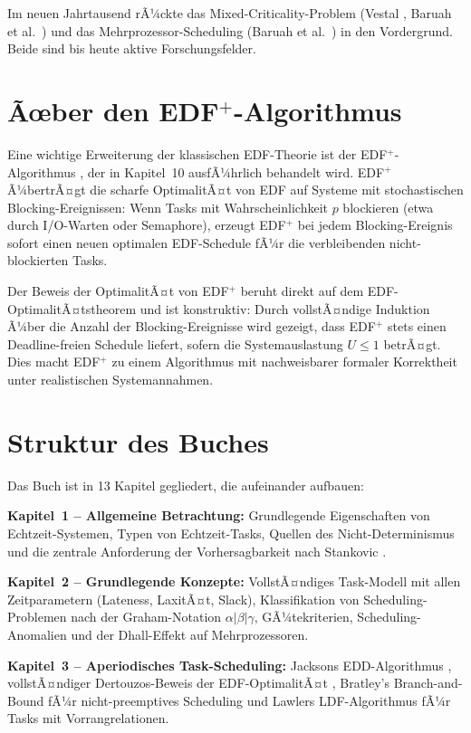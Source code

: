 ﻿\documentclass[a4paper,12pt]{report}
\theoremstyle{definition}
\begin{document}
Im neuen Jahrtausend rÃ¼ckte das Mixed-Criticality-Problem (Vestal \cite{Vestal2007},
Baruah et al.\ \cite{BaruahMCS2012}) und das Mehrprozessor-Scheduling (Baruah
et al.\ \cite{BaruahPfair1996}) in den Vordergrund. Beide sind bis heute
aktive Forschungsfelder.

\section*{Ãœber den EDF$^+$-Algorithmus}

Eine wichtige Erweiterung der klassischen EDF-Theorie ist der EDF$^+$-Algorithmus
\cite{Epp2026}, der in Kapitel~10 ausfÃ¼hrlich behandelt wird. EDF$^+$ Ã¼bertrÃ¤gt
die scharfe OptimalitÃ¤t von EDF auf Systeme mit stochastischen Blocking-Ereignissen:
Wenn Tasks mit Wahrscheinlichkeit $p$ blockieren (etwa durch I/O-Warten oder
Semaphore), erzeugt EDF$^+$ bei jedem Blocking-Ereignis sofort einen neuen
optimalen EDF-Schedule fÃ¼r die verbleibenden nicht-blockierten Tasks.

Der Beweis der OptimalitÃ¤t von EDF$^+$ beruht direkt auf dem EDF-OptimalitÃ¤tstheorem
und ist konstruktiv: Durch vollstÃ¤ndige Induktion Ã¼ber die Anzahl der
Blocking-Ereignisse wird gezeigt, dass EDF$^+$ stets einen Deadline-freien
Schedule liefert, sofern die Systemauslastung $U \leq 1$ betrÃ¤gt. Dies macht
EDF$^+$ zu einem Algorithmus mit nachweisbarer formaler Korrektheit unter
realistischen Systemannahmen.

\section*{Struktur des Buches}

Das Buch ist in 13 Kapitel gegliedert, die aufeinander aufbauen:

\textbf{Kapitel~1 -- Allgemeine Betrachtung:} Grundlegende Eigenschaften von
Echtzeit-Systemen, Typen von Echtzeit-Tasks, Quellen des Nicht-Determinismus
und die zentrale Anforderung der Vorhersagbarkeit nach Stankovic \cite{Stankovic1988}.

\textbf{Kapitel~2 -- Grundlegende Konzepte:} VollstÃ¤ndiges Task-Modell mit
allen Zeitparametern (Lateness, LaxitÃ¤t, Slack), Klassifikation von Scheduling-Problemen
nach der Graham-Notation $\alpha|\beta|\gamma$, GÃ¼tekriterien, Scheduling-Anomalien
und der Dhall-Effekt auf Mehrprozessoren.

\textbf{Kapitel~3 -- Aperiodisches Task-Scheduling:} Jacksons EDD-Algorithmus
\cite{Jackson1955}, vollstÃ¤ndiger Dertouzos-Beweis der EDF-OptimalitÃ¤t
\cite{Dertouzos1974}, Bratley's Branch-and-Bound fÃ¼r nicht-preemptives Scheduling
\cite{Bratley1971} und Lawlers LDF-Algorithmus \cite{Lawler1973} fÃ¼r Tasks
mit Vorrangrelationen.
\end{document}
